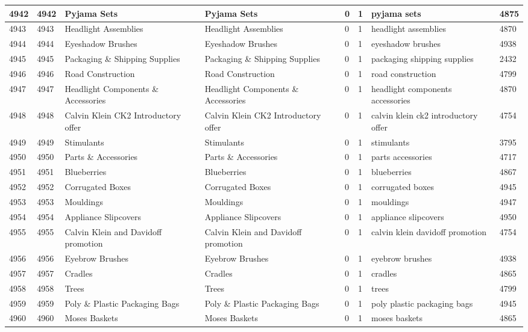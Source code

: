 \begin{longtable}{|l|l|l|l|l|l|l|l|}
4942 & 4942 & Pyjama Sets & Pyjama Sets & 0 & 1 & pyjama sets & 4875 \\ \hline 
4943 & 4943 & Headlight Assemblies & Headlight Assemblies & 0 & 1 & headlight assemblies & 4870 \\ \hline 
4944 & 4944 & Eyeshadow Brushes & Eyeshadow Brushes & 0 & 1 & eyeshadow brushes & 4938 \\ \hline 
4945 & 4945 & Packaging \& Shipping Supplies & Packaging \& Shipping Supplies & 0 & 1 & packaging shipping supplies & 2432 \\ \hline 
4946 & 4946 & Road Construction & Road Construction & 0 & 1 & road construction & 4799 \\ \hline 
4947 & 4947 & Headlight Components \& Accessories & Headlight Components \& Accessories & 0 & 1 & headlight components accessories & 4870 \\ \hline 
4948 & 4948 & Calvin Klein CK2 Introductory offer & Calvin Klein CK2 Introductory offer & 0 & 1 & calvin klein ck2 introductory offer & 4754 \\ \hline 
4949 & 4949 & Stimulants & Stimulants & 0 & 1 & stimulants & 3795 \\ \hline 
4950 & 4950 & Parts \& Accessories & Parts \& Accessories & 0 & 1 & parts accessories & 4717 \\ \hline 
4951 & 4951 & Blueberries & Blueberries & 0 & 1 & blueberries & 4867 \\ \hline 
4952 & 4952 & Corrugated Boxes & Corrugated Boxes & 0 & 1 & corrugated boxes & 4945 \\ \hline 
4953 & 4953 & Mouldings & Mouldings & 0 & 1 & mouldings & 4947 \\ \hline 
4954 & 4954 & Appliance Slipcovers & Appliance Slipcovers & 0 & 1 & appliance slipcovers & 4950 \\ \hline 
4955 & 4955 & Calvin Klein and Davidoff  promotion & Calvin Klein and Davidoff  promotion & 0 & 1 & calvin klein davidoff promotion & 4754 \\ \hline 
4956 & 4956 & Eyebrow Brushes & Eyebrow Brushes & 0 & 1 & eyebrow brushes & 4938 \\ \hline 
4957 & 4957 & Cradles & Cradles & 0 & 1 & cradles & 4865 \\ \hline 
4958 & 4958 & Trees & Trees & 0 & 1 & trees & 4799 \\ \hline 
4959 & 4959 & Poly \& Plastic Packaging Bags & Poly \& Plastic Packaging Bags & 0 & 1 & poly plastic packaging bags & 4945 \\ \hline 
4960 & 4960 & Moses Baskets & Moses Baskets & 0 & 1 & moses baskets & 4865 \\ \hline 

\end{longtable}
